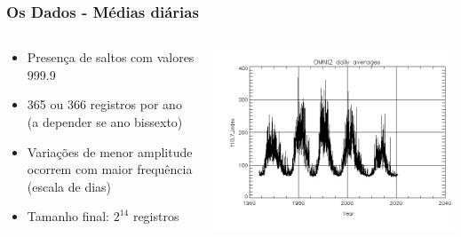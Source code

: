 \documentclass{beamer}
\begin{document}
\begin{frame}
\frametitle{Os Dados - Médias diárias}
\begin{columns}
\begin{column}{0.4\textwidth}
\begin{itemize}
\item Presença de saltos com valores 999.9
\item 365 ou 366 registros por ano (a depender se ano bissexto)
\item Variações de menor amplitude ocorrem com maior frequência (escala de dias)
\item Tamanho final: $2^{14}$ registros
\end{itemize}
\end{column}
\begin{column}{0.6\textwidth}  %
    \begin{center}
     \includegraphics[scale=0.55]{Figuras/jpg_omni2_daily_wSxReptBqw.jpg}
     \end{center}
\end{column}
\end{columns}
\end{frame}
\end{document}
